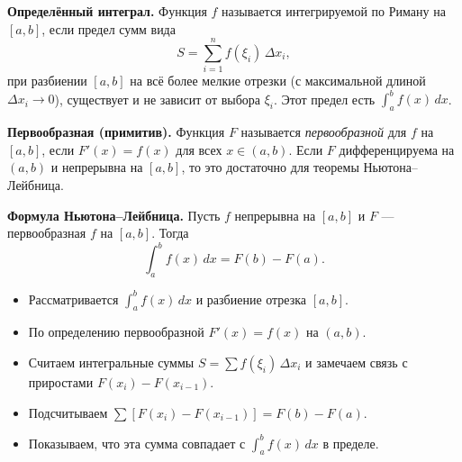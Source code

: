 

\textbf{Определённый интеграл.}
Функция \(f\) называется интегрируемой по Риману на \([a,b]\), если предел сумм вида
\[
S = \sum_{i=1}^n f(\xi_i)\,\Delta x_i,
\]
при разбиении \([a,b]\) на всё более мелкие отрезки (с максимальной длиной \(\Delta x_i \to 0\)), существует и не зависит от выбора \(\xi_i\). Этот предел есть \(\int_a^b f(x)\,dx\).

\medskip

\textbf{Первообразная (примитив).}
Функция \(F\) называется \emph{первообразной} для \(f\) на \([a,b]\), если \(F'(x)=f(x)\) для всех \(x\in(a,b)\). Если \(F\) дифференцируема на \((a,b)\) и непрерывна на \([a,b]\), то это достаточно для теоремы Ньютона–Лейбница.

\medskip


\textbf{Формула Ньютона–Лейбница.}
Пусть \(f\) непрерывна на \([a,b]\) и \(F\) — первообразная \(f\) на \([a,b]\). Тогда
\[
\int_a^b f(x)\,dx = F(b) - F(a).
\]

\medskip


\begin{itemize}
  \item Рассматривается \(\int_a^b f(x)\,dx\) и разбиение отрезка \([a,b]\).  
  \item По определению первообразной \(F'(x)=f(x)\) на \((a,b)\).  
  \item Считаем интегральные суммы \(S = \sum f(\xi_i)\,\Delta x_i\) и замечаем связь с приростами \(F(x_i) - F(x_{i-1})\).  
  \item Подсчитываем \(\sum [F(x_i)-F(x_{i-1})] = F(b)-F(a)\).  
  \item Показываем, что эта сумма совпадает с \(\int_a^b f(x)\,dx\) в пределе.
\end{itemize}

\medskip


